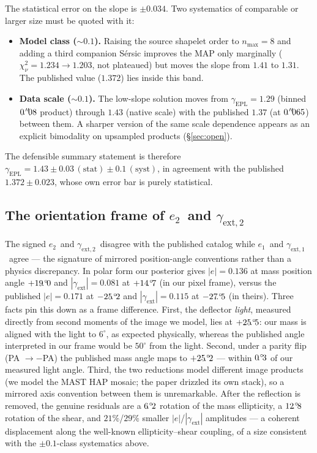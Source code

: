 \documentclass[11pt,letterpaper]{article}
\newcommand{\gammaEPL}{\ensuremath{\gamma_{\mathrm{EPL}}}}
\newcommand{\gext}{\ensuremath{\gamma_{\mathrm{ext}}}}
\newcommand{\gextone}{\ensuremath{\gamma_{\mathrm{ext},1}}}
\newcommand{\gexttwo}{\ensuremath{\gamma_{\mathrm{ext},2}}}
\newcommand{\eone}{\ensuremath{e_{1}}}
\newcommand{\etwo}{\ensuremath{e_{2}}}
\begin{document}
The statistical error on the slope is $\pm0.034$. Two systematics of
comparable or larger size must be quoted with it:

\begin{itemize}
\item {\bf Model class ($\sim$$0.1$).} Raising the source shapelet
order to $n_{\max}=8$ and adding a third companion S\'{e}rsic improves
the MAP only marginally ($\chi^{2}_{\nu}=1.234\to1.203$, not plateaued)
but moves the slope from $1.41$ to $1.31$. The published value
($1.372$) lies inside this band.
\item {\bf Data scale ($\sim$$0.1$).} The low-slope solution moves from
$\gammaEPL=1.29$ (binned $0\mbox{$\!\!\,.{}^{\prime\prime}\!\!\,$}08$ product) through $1.43$ (native
scale) with the published $1.37$ (at $0\mbox{$\!\!\,.{}^{\prime\prime}\!\!\,$}065$) between them. A
sharper version of the same scale dependence appears as an explicit
bimodality on upsampled products (\S\ref{sec:open}).
\end{itemize}

\noindent The defensible summary statement is therefore
$\gammaEPL = 1.43 \pm 0.03\,\mathrm{(stat)} \pm 0.1\,\mathrm{(syst)}$,
in agreement with the published $1.372\pm0.023$, whose own error bar is
purely statistical.

\subsection{The orientation frame of \etwo\ and \gexttwo}
\label{sec:result-orientation}

The signed \etwo\ and \gexttwo\ disagree with the published catalog
while \eone\ and \gextone\ agree --- the signature of mirrored
position-angle conventions rather than a physics discrepancy. In polar
form our posterior gives $|e| = 0.136$ at mass position angle
$+19\mbox{$\!\!\,.{}^{\circ}\!\!\,$}0$ and $|\gext| = 0.081$ at $+14\mbox{$\!\!\,.{}^{\circ}\!\!\,$}7$ (in our pixel frame),
versus the published $|e| = 0.171$ at $-25\mbox{$\!\!\,.{}^{\circ}\!\!\,$}2$ and $|\gext| = 0.115$
at $-27\mbox{$\!\!\,.{}^{\circ}\!\!\,$}5$ (in theirs). Three facts pin this down as a frame
difference. First, the deflector {\it light}, measured directly from
second moments of the image we model, lies at $+25\mbox{$\!\!\,.{}^{\circ}\!\!\,$}5$: our mass is
aligned with the light to $6^{\circ}$, as expected physically, whereas
the published angle interpreted in our frame would be $50^{\circ}$ from
the light. Second, under a parity flip (PA $\to-$PA) the published mass
angle maps to $+25\mbox{$\!\!\,.{}^{\circ}\!\!\,$}2$ --- within $0\mbox{$\!\!\,.{}^{\circ}\!\!\,$}3$ of our measured light
angle. Third, the two reductions model different image products (we
model the MAST HAP mosaic; the paper drizzled its own stack), so a
mirrored axis convention between them is unremarkable. After the
reflection is removed, the genuine residuals are a $6\mbox{$\!\!\,.{}^{\circ}\!\!\,$}2$ rotation
of the mass ellipticity, a $12\mbox{$\!\!\,.{}^{\circ}\!\!\,$}8$ rotation of the shear, and
$21\%$/$29\%$ smaller $|e|$/$|\gext|$ amplitudes --- a coherent
displacement along the well-known ellipticity--shear coupling, of a
size consistent with the $\pm0.1$-class systematics above.
\end{document}
